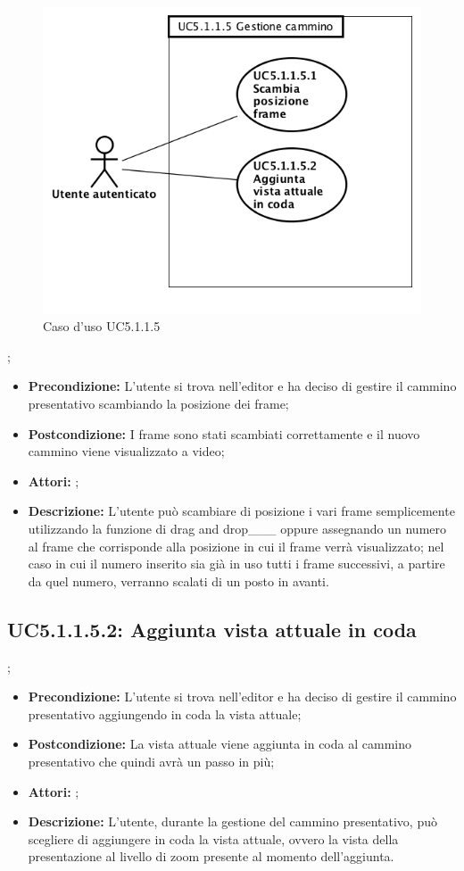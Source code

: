 \begin{figure}[h]
	\begin{center}
	\includegraphics[scale=0.4]{diagram/UC5-1-1-5.png}
	\caption{Caso d'uso UC5.1.1.5}
	\end{center}
\end{figure};
\begin{itemize}
	\item \textbf{Precondizione:} L’utente si trova nell’editor e ha deciso di gestire il cammino presentativo scambiando la posizione dei frame;
	\item \textbf{Postcondizione:} I frame sono stati scambiati correttamente e il nuovo cammino viene visualizzato a video;
	\item \textbf{Attori:} ;
	\item \textbf{Descrizione:} L’utente può scambiare di posizione i vari frame semplicemente utilizzando la funzione di drag and drop___ oppure assegnando un numero al frame che corrisponde alla posizione in cui il frame verrà visualizzato; nel caso in cui il numero inserito sia già in uso tutti i frame successivi, a partire da quel numero, verranno scalati di un posto in avanti.
\end{itemize}
\subsection{ UC5.1.1.5.2: Aggiunta vista attuale in coda}
;
\begin{itemize}
	\item \textbf{Precondizione:} L’utente si trova nell’editor e ha deciso di gestire il cammino presentativo aggiungendo in coda la vista attuale;
	\item \textbf{Postcondizione:} La vista attuale viene aggiunta in coda al cammino presentativo che quindi avrà un passo in più;
	\item \textbf{Attori:} ;
	\item \textbf{Descrizione:} L’utente, durante la gestione del cammino presentativo, può scegliere di aggiungere in coda la vista attuale, ovvero la vista della presentazione al livello di zoom presente al momento dell’aggiunta.
\end{itemize}
